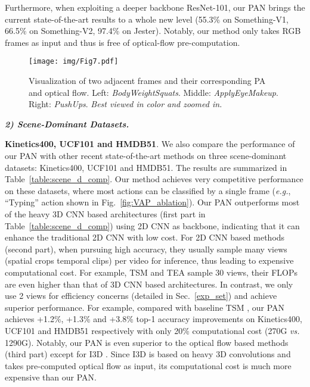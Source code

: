 \documentclass[journal]{IEEEtran}
\begin{document}
Furthermore, when exploiting a deeper backbone ResNet-101, our PAN brings the current state-of-the-art results to a whole new level (55.3\% on Something-V1, 66.5\% on Something-V2, 97.4\% on Jester). Notably, our method only takes RGB frames as input and thus is free of optical-flow pre-computation.






\begin{figure*}[!htbp]
\begin{center}
   \texttt{[image: img/Fig7.pdf]}
\end{center}
   \caption{Visualization of two adjacent frames and their corresponding PA and optical flow. Left: \emph{BodyWeightSquats}. Middle: \emph{ApplyEyeMakeup}. Right: \emph{PushUps}. \emph{Best viewed in color and zoomed in.}}
\label{fig:vis}
\end{figure*}

\emph{\textbf{2) Scene-Dominant Datasets.}}

\textbf{Kinetics400, UCF101 and HMDB51}. We also compare the performance of our PAN with other recent state-of-the-art methods on three scene-dominant datasets: Kinetics400, UCF101 and HMDB51. The results are summarized in Table~\ref{table:scene_d_comp}. Our method achieves very competitive performance on these datasets, where most actions can be classified by a single frame (\emph{e.g.}, ``Typing'' action shown in Fig.~\ref{fig:VAP_ablation}). Our PAN outperforms most of the heavy 3D CNN based architectures (first part in Table~\ref{table:scene_d_comp}) \cite{Diba2018SpatioTemporalCC,zolfaghari2018eco,carreira2017quo} using 2D CNN as backbone, indicating that it can enhance the traditional 2D CNN with low cost. For 2D CNN based methods (second part), when pursuing high accuracy, they usually sample many views (spatial crops  temporal clips) per video for inference, thus leading to expensive computational cost. For example, TSM \cite{lin2019tsm} and TEA \cite{Li_2020_CVPR} sample 30 views, their FLOPs are even higher than that of 3D CNN based architectures. In contrast, we only use 2 views for efficiency concerns (detailed in Sec.~\ref{exp_set}) and achieve superior performance. For example, compared with baseline TSM \cite{lin2019tsm}, our PAN achieves +1.2\%, +1.3\% and +3.8\% top-1 accuracy improvements on Kinetics400, UCF101 and HMDB51 respectively with only 20\% computational cost (270G \emph{vs.} 1290G). Notably, our PAN is even superior to the optical flow based methods (third part) except for I3D \cite{carreira2017quo}. Since I3D is based on heavy 3D convolutions and takes pre-computed optical flow as input, its computational cost is much more expensive than our PAN.
\end{document}
